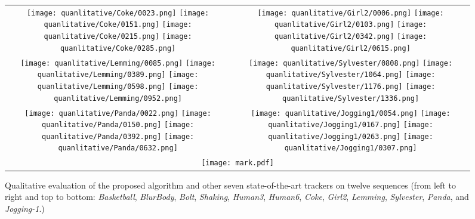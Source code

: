 \documentclass[10pt,twocolumn,letterpaper]{article}
\begin{document}
\begin{figure*}[!t]
\begin{tabular}{@{\hspace{.0mm}}c@{\hspace{1.95mm}} @{\hspace{.0mm}}c@{\hspace{.0mm}}}
\texttt{[image: quanlitative/Coke/0023.png]} \texttt{[image: quanlitative/Coke/0151.png]} \texttt{[image: quanlitative/Coke/0215.png]} \texttt{[image: quanlitative/Coke/0285.png]} & \texttt{[image: quanlitative/Girl2/0006.png]} \texttt{[image: quanlitative/Girl2/0103.png]} \texttt{[image: quanlitative/Girl2/0342.png]} \texttt{[image: quanlitative/Girl2/0615.png]} \\
\texttt{[image: quanlitative/Lemming/0085.png]} \texttt{[image: quanlitative/Lemming/0389.png]} \texttt{[image: quanlitative/Lemming/0598.png]} \texttt{[image: quanlitative/Lemming/0952.png]} & \texttt{[image: quanlitative/Sylvester/0808.png]} \texttt{[image: quanlitative/Sylvester/1064.png]} \texttt{[image: quanlitative/Sylvester/1176.png]} \texttt{[image: quanlitative/Sylvester/1336.png]} \\
\texttt{[image: quanlitative/Panda/0022.png]} \texttt{[image: quanlitative/Panda/0150.png]} \texttt{[image: quanlitative/Panda/0392.png]} \texttt{[image: quanlitative/Panda/0632.png]} & \texttt{[image: quanlitative/Jogging1/0054.png]} \texttt{[image: quanlitative/Jogging1/0167.png]} \texttt{[image: quanlitative/Jogging1/0263.png]} \texttt{[image: quanlitative/Jogging1/0307.png]} \\
\multicolumn{2}{c}{\texttt{[image: mark.pdf]}}\\
\end{tabular}
\caption{Qualitative evaluation of the proposed algorithm and other seven state-of-the-art trackers on twelve sequences (from left to right and top to bottom: {\it Basketball}, {\it BlurBody}, {\it Bolt}, {\it Shaking}, {\it Human3}, {\it Human6}, {\it Coke}, {\it Girl2}, {\it Lemming}, {\it Sylvester}, {\it Panda}, and {\it Jogging-1}.)}
\label{qua_res}
\end{figure*}
\end{document}
